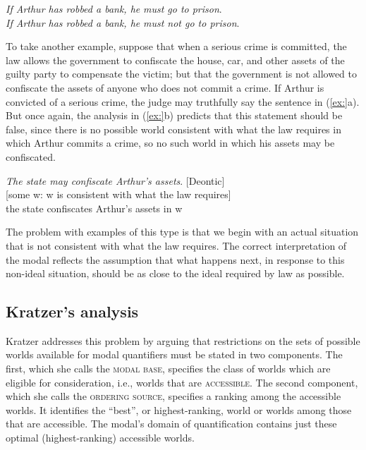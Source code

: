 \ea
\ea \textit{If Arthur has robbed a bank, he} \textit{must go to prison}.\\
\ex \textit{If Arthur has robbed a bank, he} \textit{must not go to prison}.
                       \z
\z


To take another example, suppose that when a serious crime is committed, the law allows the government to confiscate the house, car, and other assets of the guilty party to compensate the victim; but that the government is not allowed to confiscate the assets of anyone who does not commit a crime. If Arthur is convicted of a serious crime, the judge may truthfully say the sentence in (\ref{ex:}a). But once again, the analysis in (\ref{ex:}b) predicts that this statement should be false, since there is no possible world consistent with what the law requires in which Arthur commits a crime, so no such world in which his assets may be confiscated.


\ea
\ea \textit{The state may confiscate Arthur’s assets}.  [Deontic]\\
\ex{} [some w: w is consistent with what the law requires]\\
  the state confiscates Arthur’s assets in w
\z
\z


The problem with examples of this type is that we begin with an actual situation that is not consistent with what the law requires. The correct interpretation of the modal reflects the assumption that what happens next, in response to this non-ideal situation, should be as close to the ideal required by law as possible.


\subsection{Kratzer’s analysis}\label{sec:16.3.2}

Kratzer addresses this problem by arguing that restrictions on the sets of possible worlds available for modal quantifiers must be stated in two components. The first, which she calls the \textsc{modal base}, specifies the class of worlds which are eligible for consideration, i.e., worlds that are \textsc{accessible}. The second component, which she calls the \textsc{ordering source}, specifies a ranking among the accessible worlds. It identifies the “best”, or highest-ranking, world or worlds among those that are accessible. The modal’s domain of quantification contains just these optimal (highest-ranking) accessible worlds.



